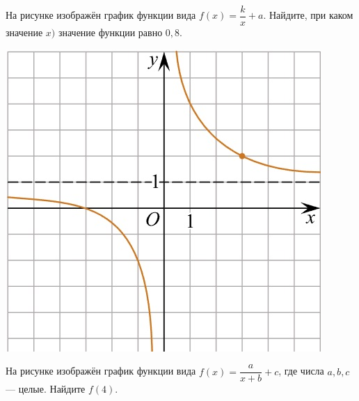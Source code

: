 \begin{class}[number=5]
	\begin{listofex}
		\item
		\begin{minipage}[t]{0.67\textwidth}
			На рисунке изображён график функции вида \(f(x)=\dfrac{k}{x}+a\). Найдите, при каком значение \(x)\) значение функции равно \(0,8\).
		\end{minipage}
		\begin{minipage}[c]{0.25\textwidth}
			\includegraphics[align=t, width=\textwidth]{pics/G101M4C5-1.jpg}
		\end{minipage}
		\item
		\begin{minipage}[t]{0.67\textwidth}
			На рисунке изображён график функции вида \(f(x)=\dfrac{a}{x+b}+c\), где числа \(a, b, c\) --- целые. Найдите \(f(4)\).
		\end{minipage}
		\begin{minipage}[c]{0.25\textwidth}

\end{minipage}
\end{listofex}
\end{class}
